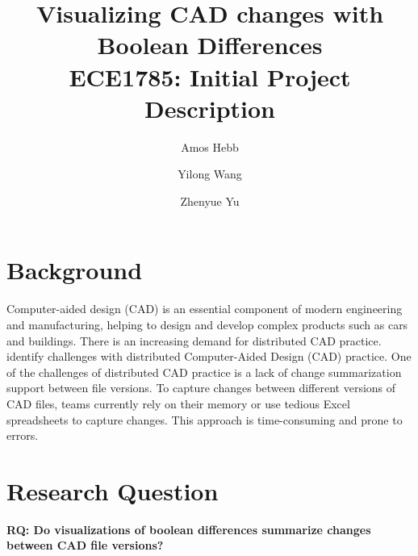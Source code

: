 \documentclass[sigconf,authorversion,nonacm]{acmart}
\begin{document}
\title{Visualizing CAD changes with Boolean Differences\\
{\normalsize ECE1785: Initial Project Description}}

\author{Amos Hebb}
\author{Yilong Wang}
\author{Zhenyue Yu}
\makeatletter
\def\@ACM@checkaffil{%
	\if@ACM@instpresent\else
		\ClassWarningNoLine{\@classname}{No institution present for an affiliation}%
	\fi
	\if@ACM@citypresent\else
		\ClassWarningNoLine{\@classname}{No city present for an affiliation}%
	\fi
	\if@ACM@countrypresent\else
		\ClassWarningNoLine{\@classname}{No country present for an affiliation}%
	\fi
}
\makeatother

\maketitle

\section{Background}

Computer-aided design (CAD) is an essential component of modern engineering and manufacturing, helping to design and develop complex products such as cars and buildings. There is an increasing demand for distributed CAD practice. \citet{cheng2023age} identify challenges with distributed Computer-Aided Design (CAD) practice. One of the challenges of distributed CAD practice is a lack of change summarization support between file versions. To capture changes between different versions of CAD files, teams currently rely on their memory or use tedious Excel spreadsheets to capture changes. This approach is time-consuming and prone to errors.
\section{Research Question}

\textbf{RQ: Do visualizations of boolean differences summarize changes between CAD file versions?}
\end{document}
